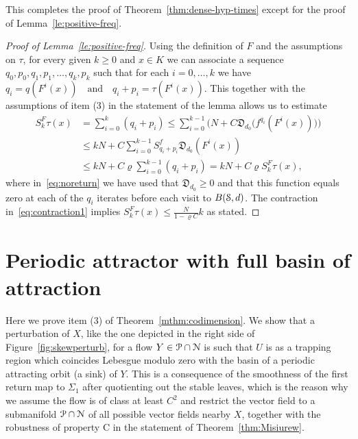 \documentclass[reqno,12pt,a4paper]{amsart}
\theoremstyle{plain}
\theoremstyle{definition}
\begin{document}
  This completes the proof of
  Theorem~\ref{thm:dense-hyp-times} except for the proof of
  Lemma~\ref{le:positive-freq}.

\begin{proof}[Proof of Lemma~\ref{le:positive-freq}]
  Using the definition of $F$ and the assumptions on $\tau$,
  for every given $k\ge0$ and $x\in K$ we can associate a
  sequence $q_0,p_0,q_1,p_1,\dots,q_k,p_k$ such that for
  each $i=0,\dots,k$ we have $ q_i=q(F^i(x))
  \quad\text{and}\quad q_i+p_i=\tau(F^i(x)).$ This
  together with the assumptions of item (3) in the statement
  of the lemma allows us to estimate
  \begin{align}
    S_{k}^F\tau(x) &= \sum_{i=0}^k ( q_i + p_i) \le
    \sum_{i=0}^{k-1}\Big( N +
    C{{\mathfrak D}}_{d_0}\big(f^{q_i}(F^i(x))\big) \Big) \nonumber
    \\
    &\le k N + C\sum_{i=0}^{k-1}
    S^f_{q_i+p_i} {{\mathfrak D}}_{d_0} (F^i(x)) \label{eq:noreturn}
    \\
    &\le \label{eq:contraction1} k N
    + C{\varrho}
    \sum_{i=0}^{k-1}(q_i+p_i) = k N +
    C{\varrho} S_{k}^F\tau(x),
  \end{align}
  where in~\eqref{eq:noreturn} we have used that
  ${{\mathfrak D}}_{d_0}\ge0$ and that this function equals zero at each
  of the $q_i$ iterates before each visit to $B({\EuScript{S}},d)$.
  The contraction in~\eqref{eq:contraction1} implies $
  S_k^F\tau(x) \le \frac{N}{1-{\varrho} C}k $ as stated.
\end{proof}

\section{Periodic attractor with full basin of attraction}
\label{sec:full-basin-attract}

Here we prove item (3) of Theorem~\ref{mthm:codimension}. We
show that a perturbation of $X$, like the one depicted in
the right side of Figure~\ref{fig:skewperturb}, for a flow
$Y\in{\EuScript{P}}\cap{\EuScript{N}}$ is such that $U$ is as a trapping region
which coincides Lebesgue modulo zero with the basin of a
periodic attracting orbit (a sink) of $Y$. This is a
consequence of the smoothness of the first return map to
$\Sigma_1$ after quotienting out the stable leaves, which is
the reason why we assume the flow is of class at least $C^2$
and restrict the vector field to a submanifold ${\EuScript{P}}\cap{\EuScript{N}}$
of all possible vector fields nearby $X$, together with the
robustness of property C in the statement of
Theorem~\ref{thm:Misiurew}.
\end{document}

